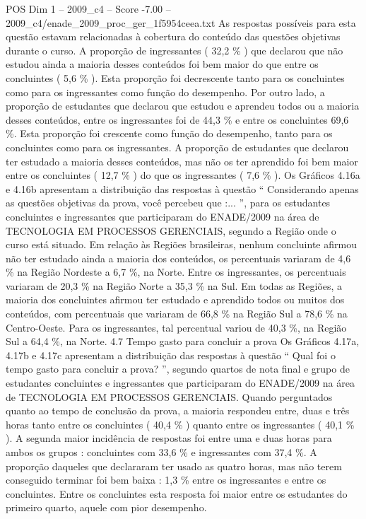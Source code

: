 \begin{textsample}{POS Dim 1 – 2009\_c4 – Score -7.00 – 2009\_c4/enade\_2009\_proc\_ger\_1f5954ceea.txt}
As respostas possíveis para esta questão estavam relacionadas à cobertura do conteúdo das questões objetivas durante o curso.
A proporção de ingressantes ( 32,2 \% ) que declarou que não estudou ainda a maioria desses conteúdos foi bem maior do que entre os concluintes ( 5,6 \% ).
Esta proporção foi decrescente tanto para os concluintes como para os ingressantes como função do desempenho.
Por outro lado, a proporção de estudantes que declarou que estudou e aprendeu todos ou a maioria desses conteúdos, entre os ingressantes foi de 44,3 \% e entre os concluintes 69,6 \%.
Esta proporção foi crescente como função do desempenho, tanto para os concluintes como para os ingressantes.
A proporção de estudantes que declarou ter estudado a maioria desses conteúdos, mas não os ter aprendido foi bem maior entre os concluintes ( 12,7 \% ) do que os ingressantes ( 7,6 \% ).
Os Gráficos 4.16a e 4.16b apresentam a distribuição das respostas à questão “ Considerando apenas as questões objetivas da prova, você percebeu que :... ”, para os estudantes concluintes e ingressantes que participaram do ENADE/2009 na área de TECNOLOGIA EM PROCESSOS GERENCIAIS, segundo a Região onde o curso está situado.
Em relação às Regiões brasileiras, nenhum concluinte afirmou não ter estudado ainda a maioria dos conteúdos, os percentuais variaram de 4,6 \% na Região Nordeste a 6,7 \%, na Norte.
Entre os ingressantes, os percentuais variaram de 20,3 \% na Região Norte a 35,3 \% na Sul.
Em todas as Regiões, a maioria dos concluintes afirmou ter estudado e aprendido todos ou muitos dos conteúdos, com percentuais que variaram de 66,8 \% na Região Sul a 78,6 \% na Centro-Oeste.
Para os ingressantes, tal percentual variou de 40,3 \%, na Região Sul a 64,4 \%, na Norte. 4.7 Tempo gasto para concluir a prova Os Gráficos 4.17a, 4.17b e 4.17c apresentam a distribuição das respostas à questão “ Qual foi o tempo gasto para concluir a prova? ”, segundo quartos de nota final e grupo de estudantes concluintes e ingressantes que participaram do ENADE/2009 na área de TECNOLOGIA EM PROCESSOS GERENCIAIS.
Quando perguntados quanto ao tempo de conclusão da prova, a maioria respondeu entre, duas e três horas tanto entre os concluintes ( 40,4 \% ) quanto entre os ingressantes ( 40,1 \% ).
A segunda maior incidência de respostas foi entre uma e duas horas para ambos os grupos : concluintes com 33,6 \% e ingressantes com 37,4 \%.
A proporção daqueles que declararam ter usado as quatro horas, mas não terem conseguido terminar foi bem baixa : 1,3 \% entre os ingressantes e entre os concluintes.
Entre os concluintes esta resposta foi maior entre os estudantes do primeiro quarto, aquele com pior desempenho.

\end{textsample}
